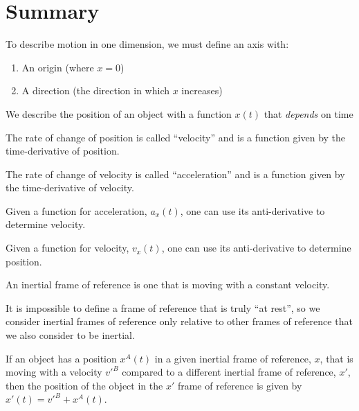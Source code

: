 \newpage
\section{Summary}
\vspace{1cm}
\begin{chapterSummary}
\item To describe motion in one dimension, we must define an axis with:
\begin{enumerate}
\item An origin (where $x=0$)
\item A direction (the direction in which $x$ increases)
\end{enumerate}
\item We describe the position of an object with a function $x(t)$ that \textit{depends} on time
\item The rate of change of position is called ``velocity'' and is a function given by the time-derivative of position.
\item The rate of change of velocity is called ``acceleration'' and is a function given by the time-derivative of velocity.
\item Given a function for acceleration, $a_x(t)$, one can use its anti-derivative to determine velocity.
\item Given a function for velocity, $v_x(t)$, one can use its anti-derivative to determine position.
\item An inertial frame of reference is one that is moving with a constant velocity.
\item It is impossible to define a frame of reference that is truly ``at rest'', so we consider inertial frames of reference only relative to other frames of reference that we also consider to be inertial.
\item If an object has a position $x^A(t)$ in a given inertial frame of reference, $x$, that is moving with a velocity $v'^B$ compared to a different inertial frame of reference, $x'$, then the position of the object in the $x'$ frame of reference is given by $x'(t)=v'^B+x^A(t)$.
\end{chapterSummary}
